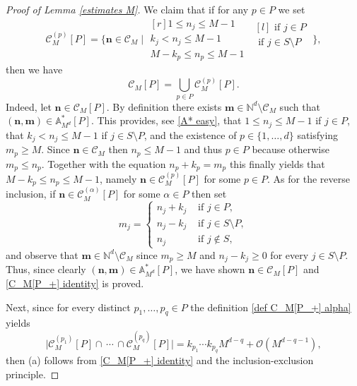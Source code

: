 \documentclass[a4paper,11pt]{article}
\numberwithin{equation}{section}
\theoremstyle{definition}
\newcommand{\eq}{\begin{equation}}
\newcommand{\qe}{\end{equation}}
\newcommand{\N}{\mathbb{N}}
\newcommand{\cO}{\mathcal{O}}
\newcommand{\bs}{\boldsymbol}
\renewcommand{\leq}{\leqslant}
\renewcommand{\geq}{\geqslant}
\begin{document}
\begin{proof}[Proof of Lemma \ref{estimates M}]
We  claim that if for any $p\in P$  we set
\eq
\label{def C_M[P_+] alpha}
\mathcal C_M^{(p)}[P]=\Bigg\{\bs n\in\mathcal C_M \; \Bigg|\;
\begin{matrix*}[r]
1\leq n_j\leq M-1\\
k_j< n_j\leq M-1\\
M-k_p\leq  n_p\leq M-1
\end{matrix*}
\;
\begin{matrix*}[l]
\mbox{ if } j\in P\\
\mbox{ if } j\in S\setminus P\\\\
\end{matrix*}\;
\Bigg\},
\qe
then we have
\eq
\label{C_M[P_+] identity}
\mathcal C_M[P]=\bigcup_{p\in P}\mathcal C_M^{(p)}[P].
\qe
Indeed, let $\bs n\in \mathcal C_M[P]$. By definition there exists $\bs m\in \N^d\setminus\mathcal C_M$ such that $(\bs n,\bs m)\in\mathbb A_{M^d}^*[P]$. This provides, see \eqref{A* easy}, that $1\leq n_j\leq M-1$ if $j\in P$, that  $k_j< n_j\leq M-1$ if $j\in S\setminus P$, and the existence of $p\in\{1,\ldots,d\}$ satisfying $m_p\geq M$. Since $\bs n\in\mathcal C_M$ then $n_p\leq M-1$ and thus $p\in P$ because otherwise $m_p\leq n_p$. Together with the equation $n_p+k_p=m_p$ this finally yields that  $M-k_p\leq n_p \leq M-1$, namely $\bs n\in \mathcal C_M^{(p)}[P]$ for some $p\in P$. As for the reverse inclusion, if $\bs n\in \mathcal C_M^{(\alpha)}[P]$ for some $\alpha\in P$ then  set
\[
m_j=
\begin{cases} n_j+k_j & \mbox{ if } j\in P,\\
 n_j-k_j & \mbox{ if } j\in S\setminus P,\\
 n_j & \mbox{ if } j\notin S,
 \end{cases}
\]
and observe that $\bs m\in \N^d\setminus\mathcal C_M$ since $m_p\geq M$ and $n_j-k_j\geq 0$ for every $j\in S\setminus P$. Thus, since clearly $(\bs n,\bs m)\in\mathbb A_{M^d}^*[P]$, we have shown  $\bs n\in \mathcal C_M[P]$ and \eqref{C_M[P_+] identity} is proved.

Next, since for every  distinct  $p_1,\ldots,p_q\in P$ the definition \eqref{def C_M[P_+] alpha} yields
\[
\big| \mathcal C_M^{(p_1)}[P]\cap \,\cdots\,\cap  \mathcal C_M^{(p_q)}[P] \big|= k_{p_1}\cdots k_{p_q} M^{d-q}+\cO(M^{d-q-1}),
\]
then (a) follows from  \eqref{C_M[P_+] identity} and the inclusion-exclusion principle.





\end{proof}
\end{document}
